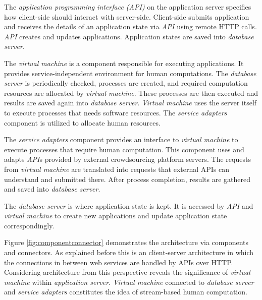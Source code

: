 The \textit{application programming interface (API)} on the application server 
specifies how client-side should interact with server-side. Client-side submits 
application and receives the details of an application state via \textit{API} using 
remote HTTP calls. \textit{API} creates and updates applications. Application 
states are saved into \textit{database server}.

The \textit{virtual machine} is a component responsible for executing applications. 
It provides service-independent environment for human computations. The 
\textit{database server} is periodically checked, processes are created, and 
required computation resources are allocated by \textit{virtual machine}. These 
processes are then executed and results are saved again into \textit{database server}. 
\textit{Virtual machine} uses the server itself to execute processes that needs 
software resources. The \textit{service adapters} component is utilized to allocate 
human resources.

The \textit{service adapters} component provides an interface to \textit{virtual machine} 
to execute processes that require human computation. This component uses and 
adapts \textit{API}s provided by external crowdsourcing platform servers. The requests 
from \textit{virtual machine} are translated into requests that external APIs can 
understand and submitted there. After process completion, results are gathered and 
saved into \textit{database server}.

The \textit{database server} is where application state is kept. It is accessed by 
\textit{API} and \textit{virtual machine} to create new applications and update 
application state correspondingly.

Figure \ref{fig:componentconnector} demonstrates the architecture via components 
and connectors. As explained before this is an client-server architecture in which 
the connections in between web services are handled by APIs over HTTP. 
Considering architecture from this perspective reveals the significance of 
\textit{virtual machine} within \textit{application server}. \textit{Virtual machine} 
connected to \textit{database server} and \textit{service adapters} constitutes 
the idea of stream-based human computation.

